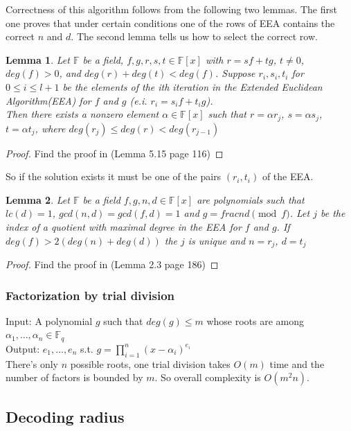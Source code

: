 \documentclass[12pt]{article}
\newtheorem{lemma}{Lemma}
\begin{document}
Correctness of this algorithm follows from the following two lemmas. The first one proves that under certain conditions one of the rows of EEA contains the correct $n$ and $d$. The second lemma tells us how to select the correct row.

\begin{lemma}
Let $\mathbb{F}$ be a field, $f, g, r, s, t \in \mathbb{F}[x]$ with $r = sf + tg$, $t \neq 0$, $deg(f) > 0$, and $deg(r) + deg(t) <deg(f)$.
Suppose $r_i, s_i, t_i$ for $0 \leq i \leq l + 1$ be the elements of the ith iteration in the Extended Euclidean Algorithm(EEA) for $f$ and $g$ (e.i. $r_i = s_if + t_ig$). \\
Then there exists a nonzero element $\alpha \in \mathbb{F}[x]$ such that $r = \alpha r_j$, $s = \alpha s_j$, $t = \alpha t_j$, where $deg(r_j) \leq deg(r) < deg(r_{j-1})$
\end{lemma}
\begin{proof}
Find the proof in \cite{[GG13]} (Lemma 5.15 page 116)
\end{proof}

So if the solution exists it must be one of the pairs $(r_i, t_i)$ of the EEA.

\begin{lemma}
Let $\mathbb{F}$ be a field $f,g,n,d \in \mathbb{F}[x]$ are polynomials such that $lc(d) = 1$, $gcd(n,d) = gcd(f,d) = 1$ and $g = frac{n}{d} \pmod{f}$. Let $j$ be the index of a quotient with maximal degree in the EEA for $f$ and $g$. If $deg(f) > 2(deg(n) + deg(d))$ the $j$ is unique and $n = r_j$, $d = t_j$
\end{lemma}
\begin{proof}
Find the proof in \cite{[KM06]} (Lemma 2.3 page 186)
\end{proof}


\subsubsection{Factorization by trial division}
\label{subsubsec:factoring_polynomials}
Input: A polynomial $g$ such that $deg(g) \leq m$ whose roots are among $\alpha_1, \dots , \alpha_n \in \mathbb{F}_q$\\
Output: $e_1, \dots , e_n$ s.t. $g = \prod_{i = 1}^{n}(x - \alpha_i)^{e_i}$\\
There's only $n$ possible roots, one trial division takes $O(m)$ time and the number of factors is bounded by $m$. So overall complexity is $O(m^2n)$.


\subsection{Decoding radius}
\label{subsec:radius_polynomials}
\end{document}
